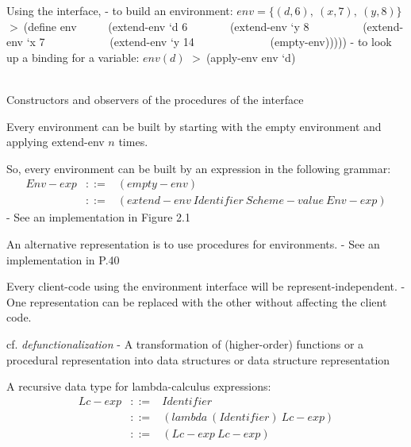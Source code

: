 \documentclass{article}
\newcommand{\mm}{\!\!-\!\!}
\newcommand{\prompt}{$> \ $}
\begin{document}
\begin{huge}

Using the interface, \al
- to build an environment: $env=\{(d,6), \ (x,7), \ (y,8) \}$ \al
\prompt (define env \al
\ \ \ \ \ 	(extend-env `d 6 \al
\ \ \ \ \ \ \ 		(extend-env `y 8 \al
\ \ \ \ \ \ \ \ \			(extend-env `x 7 \al
\ \ \ \ \ \ \ \ \ \ \ 				(extend-env `y 14 \al
\ \ \ \ \ \ \ \ \ \ \  \ \					(empty-env))))) \al \al
- to look up a binding for a variable: $env(d)$ \al
\prompt (apply-env env `d)

\ \\
Constructors and observers of the procedures of the interface \al


Every environment can be built by starting with the empty environment 
and applying extend-env $n$ times.

So, every environment can be built by an expression in the following 
grammar:
\begin{eqnarray*}
Env\mm exp & ::= & (empty \mm env)\\
           & ::= & (extend \mm env \ Identifier \ Scheme \mm value \ Env \mm exp)
\end{eqnarray*}
\al
- See an implementation in Figure 2.1


An alternative representation is to use procedures for environments. \al
- See an implementation in P.40

Every client-code using the environment interface will be 
represent-independent. \al
- One representation can be replaced with the other without affecting
the client code.

cf. {\it defunctionalization} \al
- A transformation of (higher-order) functions or a procedural representation
into data structures or data structure representation


A recursive data type for lambda-calculus expressions:
\begin{eqnarray*}
Lc\mm exp 
 & ::= & Identifier \\
 & ::= & (lambda \ ( Identifier ) \ Lc\mm exp) \\
 & ::= & (Lc\mm exp \ Lc\mm exp)
\end{eqnarray*}


\end{huge}
\end{document}
